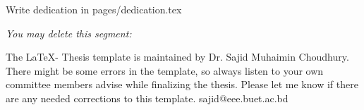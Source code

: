 Write dedication in pages/dedication.tex

\textit{You may delete this segment:}

The \LaTeX - Thesis template is maintained by Dr. Sajid Muhaimin Choudhury. There might be some errors in the template, so always listen to your own committee members advise while finalizing the thesis. Please let me know if there are any needed corrections to this template. sajid@eee.buet.ac.bd



\endinput

